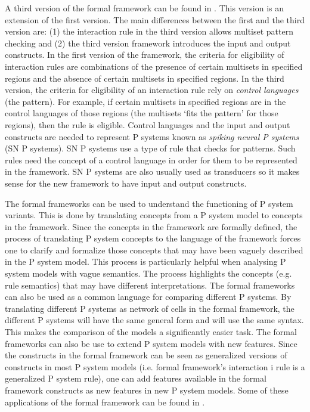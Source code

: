 \documentclass[a4paper]{article}
\theoremstyle{definition}
\begin{document}
A third version of the formal framework can be found in \cite{verlan-2020-ff-3}. This version is 
an extension of the first version. The main differences between the first and the third version are:
(1) the interaction rule in the third version allows multiset pattern checking and (2) the third
version framework introduces the input and output constructs. In the first version of the framework, 
the criteria for eligibility of interaction rules are combinations of the presence of certain 
multisets in specified regions and the absence of certain multisets in specified regions. In the
third version, the criteria for eligibility of an interaction rule rely on \emph{control languages} 
(the pattern). For example, if certain multisets in specified regions are in the control languages 
of those regions (the multisets `fits the pattern' for those regions), then the rule is eligible. 
Control languages and the input and output constructs are needed to represent P systems known as 
\emph{spiking neural P systems} (SN P systems). SN P systems use a type of rule that checks for 
patterns. Such rules need the concept of a control language in order for them to be represented in 
the framework. SN P systems are also usually used as transducers so it makes sense for the new 
framework to have input and output constructs.

The formal frameworks can be used to understand the functioning of P system variants. This is done 
by translating concepts from a P system model to concepts in the framework. Since the concepts in 
the framework are formally defined, the process of translating P system concepts to the language of
the framework forces one to clarify and formalize those concepts that may have been vaguely 
described in the P system model. This process is particularly helpful when analysing P system models 
with vague semantics. The process highlights the concepts (e.g. rule semantics) that may have 
different interpretations. The formal frameworks can also be used as a common language for comparing 
different P systems. By translating different P systems as network of cells in the formal framework, 
the different P systems will have the same general form and will use the same syntax. This makes the 
comparison of the models a significantly easier task. The formal frameworks can also be use to 
extend P system models with new features. Since the constructs in the formal framework can be seen 
as generalized versions of constructs in most P system models (i.e. formal framework's interaction i
rule is a generalized P system rule), one can add features available in the formal framework 
constructs as new features in new P system models. Some of these applications of the formal 
framework can be found in \cite{verlan-2014-ff-2.5}.
\end{document}

